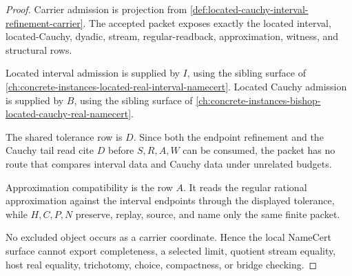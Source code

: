 \begin{proof}
Carrier admission is projection from \autoref{def:located-cauchy-interval-refinement-carrier}. The accepted packet exposes exactly the located interval, located-Cauchy, dyadic, stream, regular-readback, approximation, witness, and structural rows.

Located interval admission is supplied by $I$, using the sibling surface of \autoref{ch:concrete-instances-located-real-interval-namecert}. Located Cauchy admission is supplied by $B$, using the sibling surface of \autoref{ch:concrete-instances-bishop-located-cauchy-real-namecert}.

The shared tolerance row is $D$. Since both the endpoint refinement and the Cauchy tail read cite $D$ before $S,R,A,W$ can be consumed, the packet has no route that compares interval data and Cauchy data under unrelated budgets.

Approximation compatibility is the row $A$. It reads the regular rational approximation against the interval endpoints through the displayed tolerance, while $H,C,P,N$ preserve, replay, source, and name only the same finite packet.

No excluded object occurs as a carrier coordinate. Hence the local NameCert surface cannot export completeness, a selected limit, quotient stream equality, host real equality, trichotomy, choice, compactness, or bridge checking.
\end{proof}


